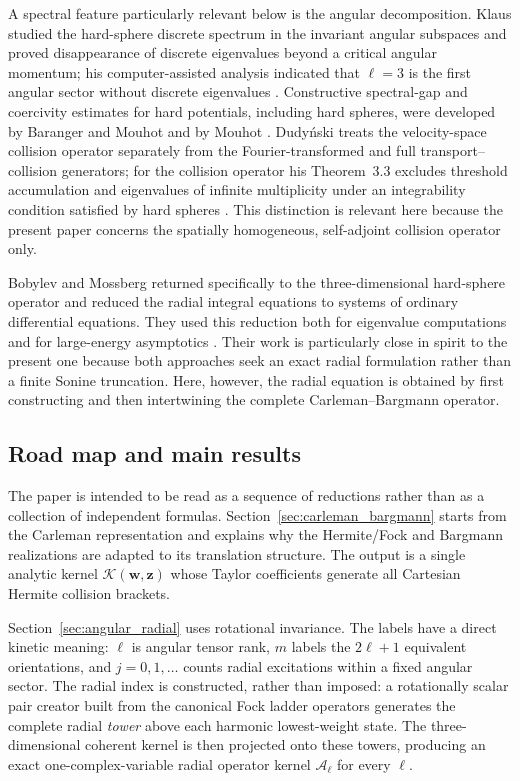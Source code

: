 \documentclass[11pt]{article}
\numberwithin{equation}{section}
\theoremstyle{definition}
\begin{document}
A spectral feature particularly relevant below is the angular decomposition.
Klaus studied the hard-sphere discrete spectrum in the invariant angular
subspaces and proved disappearance of discrete eigenvalues beyond a critical
angular momentum; his computer-assisted analysis indicated that $\ell=3$ is
the first angular sector without discrete eigenvalues \cite{Klaus1976}.
Constructive spectral-gap and coercivity estimates for hard potentials,
including hard spheres, were developed by Baranger and Mouhot and by Mouhot
\cite{BarangerMouhot2005,Mouhot2006}.  Dudy\'nski treats the velocity-space
collision operator separately from the Fourier-transformed and full
transport--collision generators; for the collision operator his Theorem~3.3
excludes threshold accumulation and eigenvalues of infinite multiplicity
under an integrability condition satisfied by hard spheres
\cite{Dudynski2013}.  This distinction is relevant here because the present
paper concerns the spatially homogeneous, self-adjoint collision operator
only.

Bobylev and Mossberg returned specifically to the three-dimensional
hard-sphere operator and reduced the radial integral equations to systems of
ordinary differential equations.  They used this reduction both for
eigenvalue computations and for large-energy asymptotics
\cite{BobylevMossberg2008}.  Their work is particularly close in spirit to the
present one because both approaches seek an exact radial formulation rather
than a finite Sonine truncation.  Here, however, the radial equation is
obtained by first constructing and then intertwining the complete
Carleman--Bargmann operator.

\subsection{Road map and main results}

The paper is intended to be read as a sequence of reductions rather than as a
collection of independent formulas.  Section~\ref{sec:carleman_bargmann} starts from the Carleman
representation and explains why the Hermite/Fock and Bargmann realizations are
adapted to its translation structure.  The output is a single analytic kernel
$\mathcal K(\bm w,\bm z)$ whose Taylor coefficients generate all Cartesian
Hermite collision brackets.

Section~\ref{sec:angular_radial} uses rotational invariance.  The labels have a direct kinetic
meaning: $\ell$ is angular tensor rank, $m$ labels the $2\ell+1$ equivalent
orientations, and $j=0,1,\ldots$ counts radial excitations within a fixed
angular sector.  The radial index is constructed, rather than imposed: a
rotationally scalar pair creator built from the canonical Fock ladder
operators generates the complete radial \emph{tower} above each harmonic
lowest-weight state.  The three-dimensional coherent kernel is then projected
onto these towers, producing an exact one-complex-variable radial operator
kernel $\mathscr A_\ell$ for every $\ell$.
\end{document}
